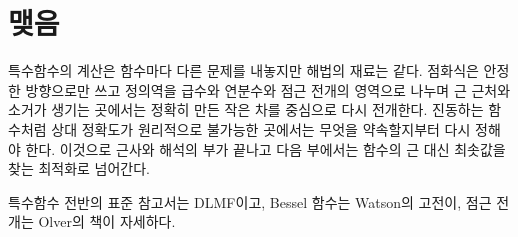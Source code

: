 \section{맺음}

특수함수의 계산은 함수마다 다른 문제를 내놓지만 해법의 재료는 같다. 점화식은 안정한 방향으로만 쓰고 정의역을 급수와 연분수와 점근 전개의 영역으로 나누며 근 근처와 소거가 생기는 곳에서는 정확히 만든 작은 차를 중심으로 다시 전개한다. 진동하는 함수처럼 상대 정확도가 원리적으로 불가능한 곳에서는 무엇을 약속할지부터 다시 정해야 한다. 이것으로 근사와 해석의 부가 끝나고 다음 부에서는 함수의 근 대신 최솟값을 찾는 최적화로 넘어간다.

특수함수 전반의 표준 참고서는 DLMF\cite{dlmf}이고, Bessel 함수는 Watson의 고전\cite{watson1944bessel}이, 점근 전개는 Olver의 책\cite{olver1974asymptotics}이 자세하다.

\chapterreferences
